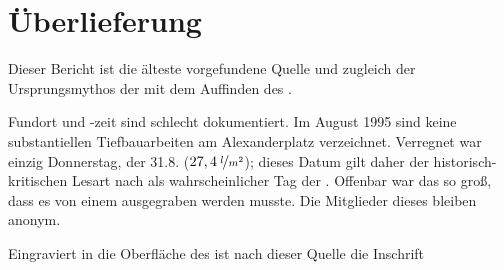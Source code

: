 \section{Überlieferung}%


Dieser Bericht ist die älteste vorgefundene Quelle und zugleich der Ur\-sprungs\-my\-thos der  mit dem Auffinden des . 

Fundort und -zeit sind schlecht dokumentiert. Im August 1995 sind keine substantiellen Tiefbauarbeiten am Alexanderplatz verzeichnet. Verregnet war einzig Donnerstag, der 31.8. ($27,4\:\nicefrac{l}{m^2}$); dieses Datum gilt daher der historisch-kritischen Lesart nach als wahrscheinlicher Tag der . Offenbar war das  so groß, dass es von einem  ausgegraben werden musste. Die Mitglieder dieses  bleiben anonym.

Eingraviert in die Oberfläche des  ist nach dieser Quelle die Inschrift 

